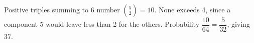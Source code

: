 Positive triples summing to 6 number $\binom52=10$. None exceeds 4, since a component 5 would leave less than 2 for the others. Probability $\dfrac{10}{64}=\dfrac{5}{32}$, giving $\boxed{37}$.
